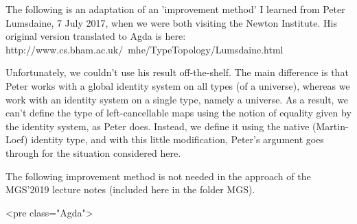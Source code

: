 The following is an adaptation of an 'improvement method' I learned
from Peter Lumsdaine, 7 July 2017, when we were both visiting the
Newton Institute. His original version translated to Agda is here:
http://www.cs.bham.ac.uk/~mhe/TypeTopology/Lumsdaine.html

Unfortunately, we couldn't use his result off-the-shelf. The main
difference is that Peter works with a global identity system on all
types (of a universe), whereas we work with an identity system on a
single type, namely a universe. As a result, we can't define the
type of left-cancellable maps using the notion of equality given by
the identity system, as Peter does. Instead, we define it using the
native (Martin-Loef) identity type, and with this little
modification, Peter's argument goes through for the situation
considered here.

The following improvement method is not needed in the approach of the
MGS'2019 lecture notes (included here in the folder MGS).

<pre class="Agda">

